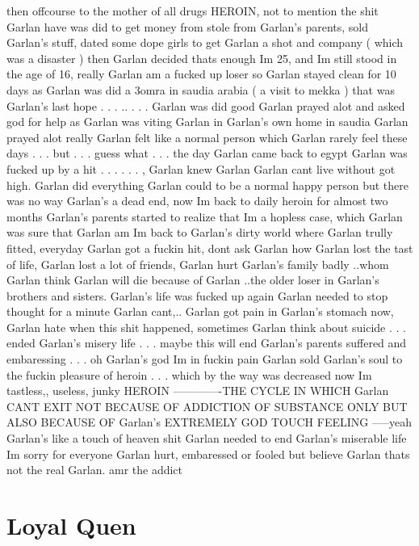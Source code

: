 \documentclass[12pt]{book}
\begin{document}
then offcourse to the mother of all drugs HEROIN, not to mention the shit Garlan have was did to get money from stole from Garlan's parents, sold Garlan's stuff, dated some dope girls to get Garlan a shot and company ( which was a disaster ) then Garlan decided thats enough Im 25, and Im still stood in the age of 16, really Garlan am a fucked up loser so Garlan stayed clean for 10 days as Garlan was did a 3omra in saudia arabia ( a visit to mekka ) that was Garlan's last hope . . . ..  . . .  Garlan was did good Garlan prayed alot and asked god for help as Garlan was viting Garlan in Garlan's own home in saudia Garlan prayed alot really Garlan felt like a normal person which Garlan rarely feel these days . . .  but . . .  guess what . . .  the day Garlan came back to egypt Garlan was fucked up by a hit . . .   . . .  , Garlan knew Garlan Garlan cant live without got high. Garlan did everything Garlan could to be a normal happy person but there was no way Garlan's a dead end, now Im back to daily heroin for almost two months Garlan's parents started to realize that Im a hopless case, which Garlan was sure that Garlan am Im back to Garlan's dirty world where Garlan trully fitted, everyday Garlan got a fuckin hit, dont ask Garlan how Garlan lost the tast of life, Garlan lost a lot of friends, Garlan hurt Garlan's family badly ..whom Garlan think Garlan will die because of Garlan ..the older loser in Garlan's brothers and sisters. Garlan's life was fucked up again Garlan needed to stop thought for a minute Garlan cant,.. Garlan got pain in Garlan's stomach now, Garlan hate when this shit happened, sometimes Garlan think about suicide  . . .  ended Garlan's misery life . . .  maybe this will end Garlan's parents suffered and embaressing  . . .  oh Garlan's god Im in fuckin pain Garlan sold Garlan's soul to the fuckin pleasure of heroin . . .  which by the way was decreased now Im tastless,, useless, junky HEROIN -------------THE CYCLE IN WHICH Garlan CANT EXIT NOT BECAUSE OF ADDICTION OF SUBSTANCE ONLY BUT ALSO BECAUSE OF Garlan's EXTREMELY GOD TOUCH FEELING -----yeah Garlan's like a touch of heaven shit Garlan needed to end Garlan's miserable life Im sorry for everyone Garlan hurt, embaressed or fooled but believe Garlan thats not the real Garlan. amr the addict



\chapter{Loyal Quen}
\end{document}
